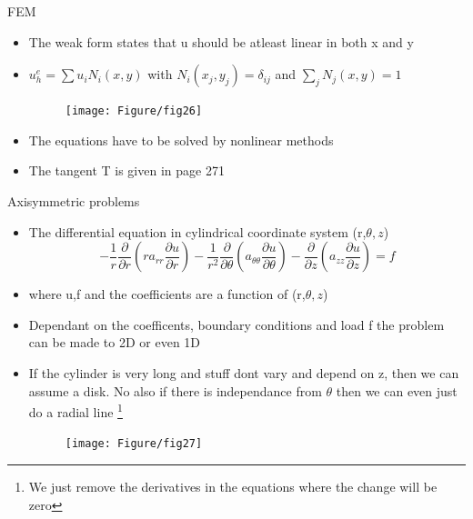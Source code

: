	\begin{frame}{FEM}
		\begin{itemize}
			\item The weak form states that u should be atleast linear in both x and y
			\item $u_h^e = \sum u_iN_i(x,y)$ with $N_i(x_j,y_j) = \delta_{ij} $ and $\sum_j N_j(x,y)=1$
			\begin{figure}
				\centering
				\texttt{[image: Figure/fig26]} 		
			\end{figure}	
		\end{itemize}
	\end{frame}


	\begin{frame}
		\begin{itemize}
			\item The equations have to be solved by nonlinear methods
			\item The tangent T is given in page 271
		\end{itemize}
	\end{frame}


	\begin{frame}{Axisymmetric problems}
		\begin{itemize}
			\item The differential equation in cylindrical coordinate system (r,$\theta,z$)
			\begin{equation}
				-\frac{1}{r}\frac{\partial}{\partial r}\left(ra_{rr}\frac{\partial u}{\partial r} \right)
				- \frac{1}{r^2}\frac{\partial}{\partial \theta}\left(a_{\theta\theta}\frac{\partial u}{\partial \theta} \right)
				- \frac{\partial}{\partial z}\left(a_{zz}\frac{\partial u}{\partial z} \right) = f
			\end{equation} 
			\item where u,f and the coefficients are a function of (r,$\theta,z$)
			\item Dependant on the coefficents, boundary conditions and load f the problem can be made to 2D or even 1D
			\item If the cylinder is very long and stuff dont vary and depend on z, then we can assume a disk. No also if there is independance from $\theta$ then we can even just do a radial line \footnote{We just remove the derivatives in the equations where the change will be zero}
			\begin{figure}
				\centering
				\texttt{[image: Figure/fig27]} 		
			\end{figure}
		\end{itemize}
	\end{frame}


